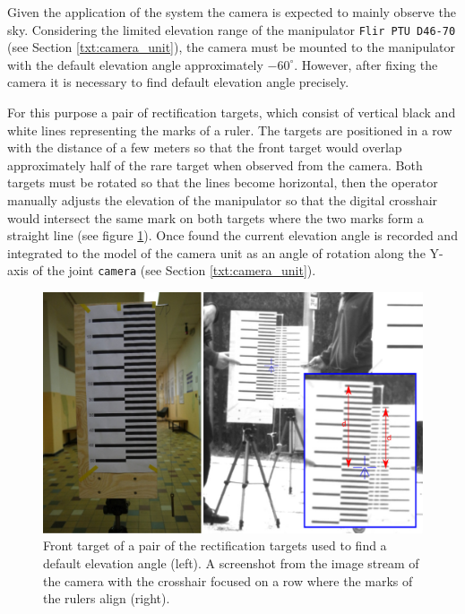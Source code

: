 Given the application of the system the camera is expected to mainly observe the sky. Considering the limited elevation range of the manipulator \texttt{Flir PTU D46-70} (see Section \ref{txt:camera_unit}), the camera must be mounted to the manipulator with the default elevation angle approximately $-60^{\circ}$. However, after fixing the camera it is necessary to find default elevation angle precisely. 

For this purpose a pair of rectification targets, which consist of vertical black and white lines representing the marks of a ruler. The targets are positioned in a row with the distance of a few meters so that the front target would overlap approximately half of the rare target when observed from the camera. Both targets must be rotated so that the lines become horizontal, then the operator manually adjusts the elevation of the manipulator so that the digital crosshair would intersect the same mark on both targets where the two marks form a straight line (see figure \ref{fig:rect_default_elevation_angle}). Once found the current elevation angle is recorded and integrated to the model of the camera unit as an angle of rotation along the Y-axis of the joint \texttt{camera} (see Section \ref{txt:camera_unit}).

\begin{figure}[htb]
	\centering
	\includegraphics[width=13cm]{fig/rect_default_elevation_angle.pdf}
	\caption{Front target of a pair of the rectification targets used to find a default elevation angle (left). A screenshot from the image stream of the camera with the crosshair focused on a row where the marks of the rulers align (right).}
	\label{fig:rect_default_elevation_angle}
\end{figure}

